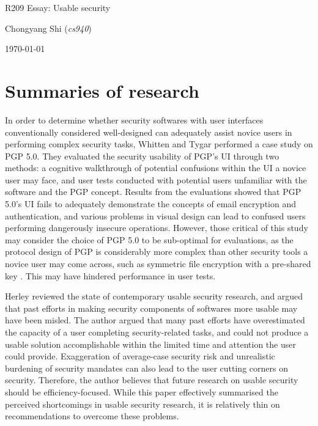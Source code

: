 \documentclass[11pt]{article}
\begin{document}
\centerline{\Large R209 Essay:  Usable security}
\vspace{2em}
\centerline{\large Chongyang Shi (\emph{cs940})}
\vspace{1em}
\centerline{\large \today}
\vspace{1em}

\section{Summaries of research}

In order to determine whether security softwares with user interfaces conventionally considered well-designed can adequately assist novice users in performing complex security tasks, Whitten and Tygar \cite{whitten1999johnny} performed a case study on PGP 5.0. They evaluated the security usability of PGP's UI through two methods: a cognitive walkthrough of potential confusions within the UI a novice user may face, and user tests conducted with potential users unfamiliar with the software and the PGP concept. Results from the evaluations showed that PGP 5.0's UI fails to adequately demonstrate the concepts of email encryption and authentication, and various problems in visual design can lead to confused users performing dangerously insecure operations. However, those critical of this study may consider the choice of PGP 5.0 to be sub-optimal for evaluations, as the protocol design of PGP is considerably more complex than other security tools a novice user may come across, such as symmetric file encryption with a pre-shared key \cite{gujrati2013usability}. This may have hindered performance in user tests.

Herley \cite{herley2014more} reviewed the state of contemporary usable security research, and argued that past efforts in making security components of softwares more usable may have been misled. The author argued that many past efforts have overestimated the capacity of a user completing security-related tasks, and could not produce a usable solution accomplishable within the limited time and attention the user could provide. Exaggeration of average-case security risk \cite[2.3]{herley2014more} and unrealistic burdening of security mandates \cite[1.3]{herley2014more} can also lead to the user cutting corners on security. Therefore, the author believes that future research on usable security should be efficiency-focused. While this paper effectively summarised the perceived shortcomings in usable security research, it is relatively thin on recommendations to overcome these problems.
\end{document}
